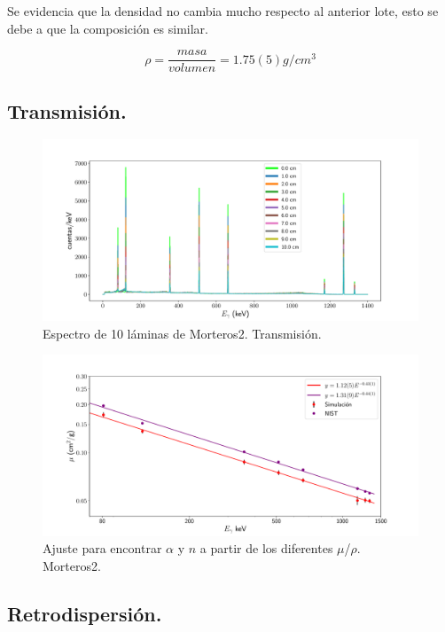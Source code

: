  Se evidencia que la densidad no cambia mucho respecto al anterior lote, esto se debe a que la composición es similar.
 
 \begin{equation} \label{densidad-mor2}
 \rho=\frac{masa}{volumen}=1.75(5) g/cm^3
 \end{equation}
 
 \subsection{Transmisión.}
 
\begin{figure}[H]
	\centering
	\includegraphics[width=1.0\linewidth]{Kap4/espectro_m2-10M-trans.pdf}
	\caption{Espectro de 10 láminas de Morteros2. Transmisión.}
	\label{fig:espectrom2-10m-trans}
\end{figure}
 
 
\begin{figure}[H]
	\centering
	\includegraphics[width=1.0\linewidth]{Kap4/mu-trans-m2.pdf}
	\caption{Ajuste para encontrar $\alpha$ y $n$ a partir de los diferentes $\mu$/$\rho$. Morteros2.}
	\label{fig:mu-trans-m2}
\end{figure}
 
 
 \subsection{Retrodispersión.}
 
